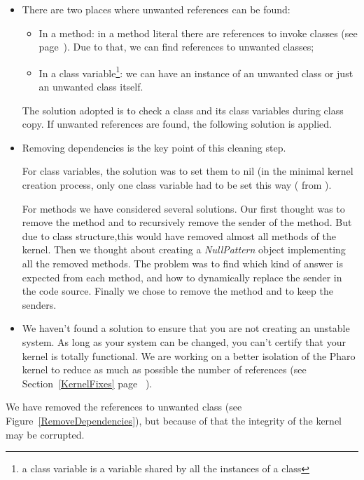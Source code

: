 \solutions
\begin{itemize}
	\item There are two places where unwanted references can be found:
		\begin{itemize}
			\item In a method: in a method literal there are references to invoke classes (see page~\pageref{literal}). Due to that, we can find references to unwanted classes;
			\item In a class variable\footnote{a class variable is a variable shared by all the instances of a class}: we can have an instance of an unwanted class or just an unwanted class itself.
		\end{itemize}
		The solution adopted is to check a class  and its class variables during class copy. If unwanted references are found, the following solution is applied.
	\item Removing dependencies is the key point of this cleaning step.
	
	For class variables, the solution was to set them to nil (in the minimal kernel creation process, only one class variable had to be set this way ( from ).

		
	For methods we have considered several solutions. Our first thought was to remove the method and to recursively remove the sender of the method. But due to class structure,this would have removed almost all methods of the kernel. Then we thought about creating a \emph{NullPattern} object implementing all the removed methods. The problem was to find which kind of answer is expected from each method, and how to dynamically replace the sender in the code source. Finally we chose to remove the method and to keep the senders.
	\item We haven't found a solution to ensure that you are not creating an unstable system.
As long as your system can be changed, you can't certify that your kernel is totally functional.
We are working on a better isolation of the \gls{Pharo} kernel to reduce as much as possible the number of references (see Section~\ref{KernelFixes} page~\pageref{KernelFixes} ).
\end{itemize}

\inanutshell We have removed the references to unwanted class (see Figure~\ref{RemoveDependencies}), but because of that the integrity of the kernel may be corrupted.


